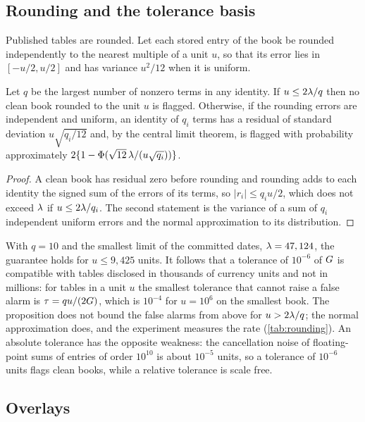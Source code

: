 \subsection{Rounding and the tolerance basis}
\label{sec:theory-rounding}

Published tables are rounded.
Let each stored entry of the book be rounded independently to the nearest multiple of a unit $u$, so that its error lies in $[-u/2,u/2]$ and has variance $u^{2}/12$ when it is uniform.

\begin{proposition}
\label{prop:rounding}
Let $q$ be the largest number of nonzero terms in any identity. If $u\le2\lambda/q$ then no clean book rounded to the unit $u$ is flagged. Otherwise, if the rounding errors are independent and uniform, an identity of $q_i$ terms has a residual of standard deviation $u\sqrt{q_i/12}$ and, by the central limit theorem, is flagged with probability approximately $2\{1-\Phi(\sqrt{12}\,\lambda/(u\sqrt{q_i}))\}$.
\end{proposition}

\begin{proof}
A clean book has residual zero before rounding and rounding adds to each identity the signed sum of the errors of its terms, so $|r_i|\le q_iu/2$, which does not exceed $\lambda$ if $u\le2\lambda/q_i$. The second statement is the variance of a sum of $q_i$ independent uniform errors and the normal approximation to its distribution.
\end{proof}

With $q=10$ and the smallest limit of the committed dates, $\lambda=47,124{}$, the guarantee holds for $u\le9{,}425$ units.
It follows that a tolerance of $10^{-6}$ of $G$ is compatible with tables disclosed in thousands of currency units and not in millions: for tables in a unit $u$ the smallest tolerance that cannot raise a false alarm is $\tau=qu/(2G)$, which is $10^{-4}$ for $u=10^{6}$ on the smallest book.
The proposition does not bound the false alarms from above for $u>2\lambda/q$; the normal approximation does, and the experiment measures the rate (\cref{tab:rounding}).
An absolute tolerance has the opposite weakness: the cancellation noise of floating-point sums of entries of order $10^{10}$ is about $10^{-5}$ units, so a tolerance of $10^{-6}$ units flags clean books, while a relative tolerance is scale free.

\subsection{Overlays}
\label{sec:theory-overlays}

